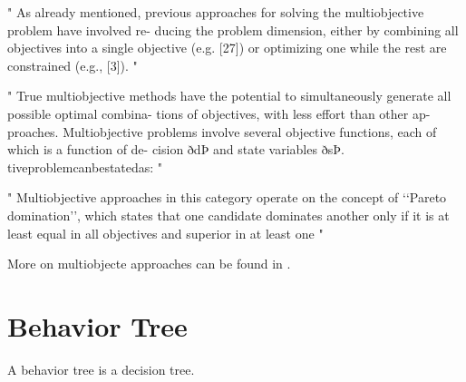 "
As already mentioned, previous approaches for solving the multiobjective problem have involved re- ducing the problem dimension, either by combining all objectives into a single objective (e.g. [27]) or optimizing one while the rest are constrained (e.g., [3]).
"\cite{erickson_multi-objective_2002}

"
True multiobjective methods have the potential to simultaneously generate all possible optimal combina- tions of objectives, with less effort than other ap- proaches. Multiobjective problems involve several objective functions, each of which is a function of de- cision ðdÞ and state variables ðsÞ. tiveproblemcanbestatedas:
"\cite{erickson_multi-objective_2002}

"
Multiobjective approaches in this category operate on the concept of ‘‘Pareto domination’’, which states that one candidate dominates another only if it is at least equal in all objectives and superior in at least one
"\cite{erickson_multi-objective_2002}

More on multiobjecte approaches can be found in \cite{erickson_multi-objective_2002}.

\fi



\section{Behavior Tree}
A behavior tree is a decision tree. 





